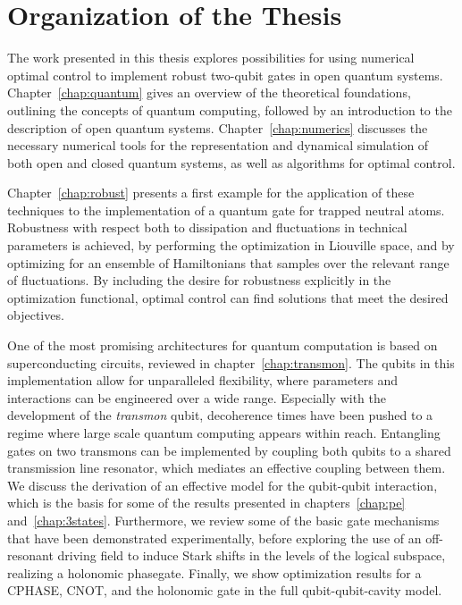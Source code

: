 \section{Organization of the Thesis}

The work presented in this thesis explores possibilities for using numerical
optimal control to implement robust two-qubit gates in open quantum systems.
Chapter~\ref{chap:quantum} gives an overview of the theoretical foundations,
outlining the concepts of quantum computing, followed by an introduction to the
description of open quantum systems.
Chapter~\ref{chap:numerics} discusses the necessary numerical tools for the
representation and dynamical simulation of both open and closed quantum systems,
as well as algorithms for optimal control.

Chapter~\ref{chap:robust} presents a first example for the application of these
techniques to the implementation of a quantum gate for trapped neutral atoms.
Robustness with respect both to dissipation and fluctuations in technical
parameters is achieved, by performing the optimization in Liouville space, and
by optimizing for an ensemble of Hamiltonians that samples over the relevant
range of fluctuations. By including the desire for robustness explicitly in the
optimization functional, optimal control can find solutions that meet the
desired objectives.

One of the most promising architectures for quantum computation is based on
superconducting circuits, reviewed in chapter~\ref{chap:transmon}. The qubits in
this implementation allow for unparalleled flexibility, where parameters
and interactions can be engineered over a wide range. Especially with
the development of the \emph{transmon} qubit,
%
decoherence times have been pushed
to a regime where large scale quantum computing appears within reach. Entangling
gates on two transmons can be implemented by coupling both qubits to a shared
transmission line resonator, which mediates an effective coupling between them.
We discuss the derivation of an effective model for the qubit-qubit
interaction, which is the basis for some of the results presented in
chapters~\ref{chap:pe} and~\ref{chap:3states}. Furthermore, we review
some of the basic gate mechanisms that have been demonstrated experimentally,
before exploring the use of an off-resonant driving field to induce Stark shifts
in the levels of the logical subspace, realizing a holonomic phasegate. Finally,
we show optimization results for a CPHASE, CNOT, and the holonomic gate in the
full qubit-qubit-cavity model.

